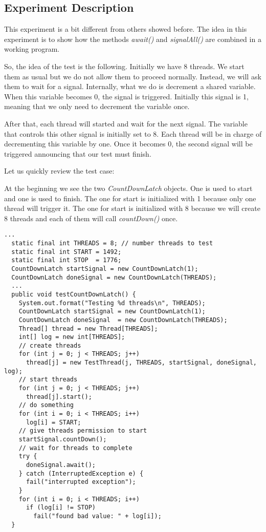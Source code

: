 \subsection{Experiment Description}
\par
This experiment is a bit different from others showed before. The idea in this
experiment is to show how the methods \textit{await()} and \textit{signalAll()}
are combined in a working program. 
\par
So, the idea of the test is the following. Initially we have 8 threads. We start
them as usual but we do not allow them to proceed normally. Instead, we will ask
them to wait for a signal. Internally, what we do is decrement a shared
variable. When this variable becomes 0, the signal is triggered. Initially this
signal is 1, meaning that we only need to decrement the variable once.
\par
After that, each thread will started and wait for the next signal. The variable
that controls this other signal is initially set to 8. Each thread will be in
charge of decrementing this variable by one. Once it becomes 0, the second
signal will be triggered announcing that our test must finish.
\par
Let us quickly review the test case:
\par
At the beginning we see the two \textit{CountDownLatch} objects. One is used to
start and one is used to finish. The one for start is initialized with 1 because
only one thread will trigger it. The one for start is initialized with 8 because
we will create 8 threads and each of them will call \textit{countDown()} once.
\par
\hfill
\begin{lstlisting}[style=numbers]
  ...
  static final int THREADS = 8; // number threads to test
  static final int START = 1492;
  static final int STOP  = 1776;
  CountDownLatch startSignal = new CountDownLatch(1);
  CountDownLatch doneSignal = new CountDownLatch(THREADS);
  ...
  public void testCountDownLatch() {                                                                                
    System.out.format("Testing %d threads\n", THREADS);                                                             
    CountDownLatch startSignal = new CountDownLatch(1);
    CountDownLatch doneSignal  = new CountDownLatch(THREADS);
    Thread[] thread = new Thread[THREADS];
    int[] log = new int[THREADS];
    // create threads
    for (int j = 0; j < THREADS; j++)
      thread[j] = new TestThread(j, THREADS, startSignal, doneSignal, log);
    // start threads
    for (int j = 0; j < THREADS; j++)
      thread[j].start();
    // do something
    for (int i = 0; i < THREADS; i++)
      log[i] = START;
    // give threads permission to start
    startSignal.countDown();
    // wait for threads to complete
    try {
      doneSignal.await();
    } catch (InterruptedException e) {
      fail("interrupted exception");
    }
    for (int i = 0; i < THREADS; i++)
      if (log[i] != STOP)
        fail("found bad value: " + log[i]);
  }
\end{lstlisting}
